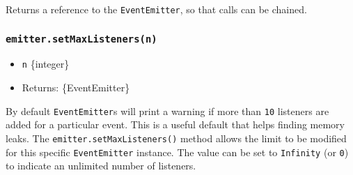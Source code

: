 \begin{Shaded}
\begin{Highlighting}[]
  \OperatorTok{=} \NormalTok{(}\NormalTok{)}\OperatorTok{;}
\OperatorTok{=}  \NormalTok{()}\OperatorTok{;}

 \NormalTok{() \{}
  \NormalTok{(}\NormalTok{)}\OperatorTok{;}
\NormalTok{\}}

\NormalTok{(}\OperatorTok{,}\OperatorTok{;}
\NormalTok{(}\OperatorTok{,}\OperatorTok{;}
\NormalTok{(}\OperatorTok{,}\OperatorTok{;}

\NormalTok{(}\NormalTok{)}\OperatorTok{;}
\NormalTok{(}\NormalTok{)}\OperatorTok{;}
\end{Highlighting}
\end{Shaded}

Returns a reference to the \texttt{EventEmitter}, so that calls can be
chained.

\subsubsection{\texorpdfstring{\texttt{emitter.setMaxListeners(n)}}{emitter.setMaxListeners(n)}}\label{emitter.setmaxlistenersn}

\begin{itemize}
\tightlist
\item
  \texttt{n} \{integer\}
\item
  Returns: \{EventEmitter\}
\end{itemize}

By default \texttt{EventEmitter}s will print a warning if more than
\texttt{10} listeners are added for a particular event. This is a useful
default that helps finding memory leaks. The
\texttt{emitter.setMaxListeners()} method allows the limit to be
modified for this specific \texttt{EventEmitter} instance. The value can
be set to \texttt{Infinity} (or \texttt{0}) to indicate an unlimited
number of listeners.

